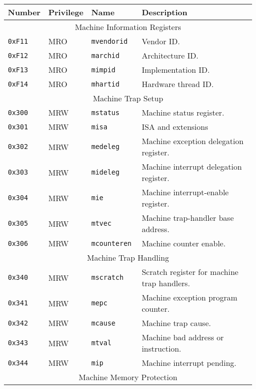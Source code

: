 \begin{table}[htb!]
\begin{center}
\begin{tabular}{|l|l|l|l|}
\hline
Number    & Privilege & Name & Description \\
\hline  
\multicolumn{4}{|c|}{Machine Information Registers} \\
\hline
\tt 0xF11 & MRO &\tt mvendorid   & Vendor ID. \\
\tt 0xF12 & MRO &\tt marchid     & Architecture ID. \\
\tt 0xF13 & MRO &\tt mimpid      & Implementation ID. \\
\tt 0xF14 & MRO &\tt mhartid     & Hardware thread ID. \\
\hline  
\multicolumn{4}{|c|}{Machine Trap Setup} \\
\hline
\tt 0x300 & MRW  &\tt mstatus    & Machine status register. \\
\tt 0x301 & MRW  &\tt misa       & ISA and extensions \\
\tt 0x302 & MRW  &\tt medeleg    & Machine exception delegation register. \\
\tt 0x303 & MRW  &\tt mideleg    & Machine interrupt delegation register. \\
\tt 0x304 & MRW  &\tt mie        & Machine interrupt-enable register. \\
\tt 0x305 & MRW  &\tt mtvec      & Machine trap-handler base address. \\
\tt 0x306 & MRW  &\tt mcounteren & Machine counter enable. \\
\hline
\multicolumn{4}{|c|}{Machine Trap Handling} \\
\hline
\tt 0x340 & MRW  &\tt mscratch   & Scratch register for machine trap handlers. \\
\tt 0x341 & MRW  &\tt mepc       & Machine exception program counter. \\
\tt 0x342 & MRW  &\tt mcause     & Machine trap cause. \\
\tt 0x343 & MRW  &\tt mtval      & Machine bad address or instruction. \\
\tt 0x344 & MRW  &\tt mip        & Machine interrupt pending. \\
\hline
\multicolumn{4}{|c|}{Machine Memory Protection} \\
\hline

\end{tabular}
\end{center}
\end{table}
